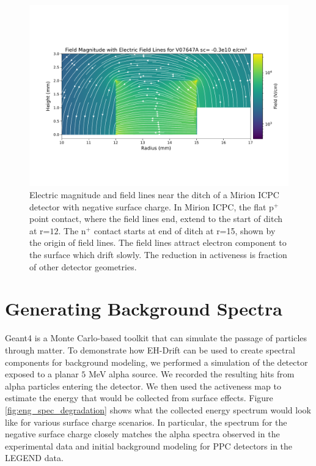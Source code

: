 \begin{figure}%
\centering
\includegraphics[trim={0cm 3cm 0cm 4.69cm},clip,width=0.99\linewidth]{ch5/figs/elect_field_lines_surface_V07647A_sc_-0.3.pdf}
\caption{Electric magnitude and field lines near the ditch of a Mirion ICPC detector with negative surface charge. In Mirion ICPC, the flat p$^+$ point contact, where the field lines end, extend to the start of ditch at r=$12$. The n$^+$ contact starts at end of ditch at r=15, shown by the origin of field lines. The field lines attract electron component to the surface which drift slowly. The reduction in activeness is fraction of other detector geometries.}
\label{ch5_fig_elect_field_lines_surface_V07647A}
\end{figure}


\section{\label{res:3} Generating Background Spectra}
Geant4 is a Monte Carlo-based toolkit that can simulate the passage of particles through matter. To demonstrate how EH-Drift can be used to create spectral components for background modeling, we performed a {\geant} simulation of the {\ponama} detector exposed to a planar $5$ MeV alpha source. We recorded the resulting hits from alpha particles entering the detector. We then used the activeness map to estimate the energy that would be collected from surface effects. Figure \ref{fig:eng_spec_degradation} shows what the collected energy spectrum would look like for various surface charge scenarios. In particular, the spectrum for the negative surface charge closely matches the alpha spectra observed in the {\MJD} experimental data and initial background modeling for PPC detectors in the LEGEND data.


